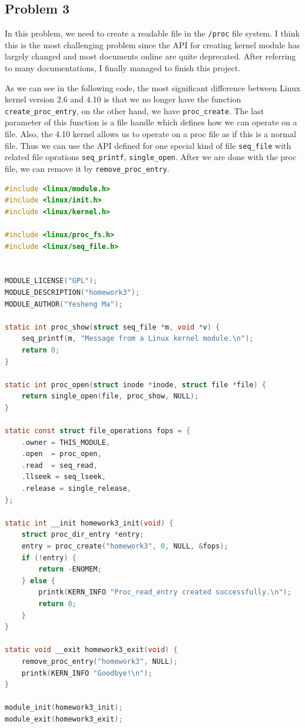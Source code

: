 \documentclass{article}
\begin{document}
\subsection{Problem 3}
In this problem, we need to create a readable file in the \texttt{/proc} file system. I think this is the most challenging problem since the API for creating kernel module has largely changed and most documents online are quite deprecated. After referring to many documentations, I finally managed to finish this project.

As we can see in the following code, the most significant difference between Linux kernel version 2.6 and 4.10 is that we no longer have the function \verb|create_proc_entry|, on the other hand, we have \verb|proc_create|. The last parameter of this function is a file handle which defines how we can operate on a file. Also, the 4.10 kernel allows us to operate on a proc file as if this is a normal file. Thus we can use the API defined for one special kind of file \texttt{seq\_file} with related file oprations \verb|seq_printf|, \verb|single_open|. After we are done with the proc file, we can remove it by \verb|remove_proc_entry|.
\begin{lstlisting}[language=c,caption=Module to create a readable proc file]
#include <linux/module.h>
#include <linux/init.h>
#include <linux/kernel.h>

#include <linux/proc_fs.h>
#include <linux/seq_file.h>


MODULE_LICENSE("GPL");
MODULE_DESCRIPTION("homework3");
MODULE_AUTHOR("Yesheng Ma");

static int proc_show(struct seq_file *m, void *v) {
    seq_printf(m, "Message from a Linux kernel module.\n");
    return 0;
}

static int proc_open(struct inode *inode, struct file *file) {
    return single_open(file, proc_show, NULL);
}

static const struct file_operations fops = {
    .owner = THIS_MODULE,
    .open  = proc_open,
    .read  = seq_read,
    .llseek = seq_lseek,
    .release = single_release,
};

static int __init homework3_init(void) {
    struct proc_dir_entry *entry;
    entry = proc_create("homework3", 0, NULL, &fops);
    if (!entry) {
        return -ENOMEM;
    } else {
        printk(KERN_INFO "Proc_read_entry created successfully.\n");
        return 0;
    }
}

static void __exit homework3_exit(void) {
    remove_proc_entry("homework3", NULL);
    printk(KERN_INFO "Goodbye!\n");
}

module_init(homework3_init);
module_exit(homework3_exit);
\end{lstlisting}
\end{document}
